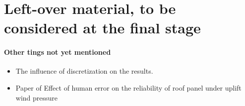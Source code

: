 
\section{Left-over material, to be considered at the final stage}

\begin{framed}
\paragraph{Other tings not yet mentioned}
\begin{itemize}
\item The influence of discretization on the results.
\item Paper of Effect of human error on the reliability of roof panel under uplift wind pressure
\end{itemize}
\end{framed}


